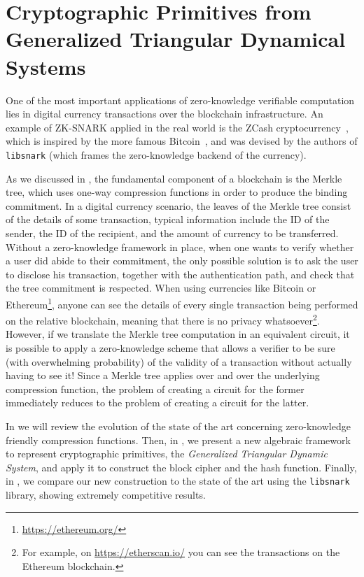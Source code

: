 \chapter{Cryptographic Primitives from Generalized Triangular Dynamical Systems}\label{chap:arion}
One of the most important applications of zero-knowledge verifiable computation lies in digital 
currency transactions over the blockchain infrastructure.
An example of ZK-SNARK applied in the real world is the ZCash cryptocurrency~\cite{SassonCGGMTV2014}, 
which is inspired by the more famous Bitcoin~\cite{NarayananBFMG2016}, and was devised by the 
authors of \texttt{libsnark} (which frames the zero-knowledge backend of the currency).

As we discussed in , the fundamental component of a blockchain is the 
Merkle tree, which uses one-way compression functions in order to produce the binding 
commitment.
In a digital currency scenario, the leaves of the Merkle tree consist of the details of some 
transaction, typical information include the ID of the sender, the ID of the recipient, and the 
amount of currency to be transferred. 
Without a zero-knowledge framework in place, when one wants to verify whether a user did abide to 
their commitment, the only possible solution is to ask the user to disclose his transaction, 
together with the authentication path, and check that the tree commitment is respected. 
When using currencies like Bitcoin or Ethereum\footnote{\url{https://ethereum.org/}}, anyone 
can see the details of every single transaction being performed on the relative 
blockchain, meaning that there is no privacy whatsoever\footnote{For example, on 
\url{https://etherscan.io/} you can see the transactions on the Ethereum blockchain. %
}.
However, if we translate the Merkle tree computation in an equivalent circuit, it is possible to 
apply a zero-knowledge scheme that allows a verifier to be sure (with overwhelming probability) 
of the validity of a transaction without actually having to see it!
Since a Merkle tree applies over and over the underlying compression function, the problem of 
creating a circuit for the former immediately reduces to the problem of creating a circuit for the 
latter.

In  we will review the evolution of the state of the art concerning zero-knowledge 
friendly compression functions.
Then, in , we present a new algebraic framework to represent cryptographic 
primitives, the \emph{Generalized Triangular Dynamic System}, and apply it to construct the 
\Arion{} block cipher and the \Arionhash{} hash function.
Finally, in , we compare our new construction to the state of the art using 
the \texttt{libsnark} library, showing extremely competitive results.



